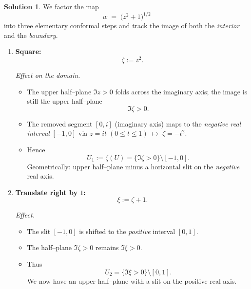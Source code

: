 \documentclass[12pt]{article}
\theoremstyle{definition} %
\newtheorem{solution}{Solution}
\theoremstyle{plain} %
\begin{document}
\begin{solution}
  We factor the map
  \[
     w \;=\; \bigl(z^{2}+1\bigr)^{1/2}
  \tag{$\ast$}\label{eq:full}
  \]
  into three elementary conformal steps and track the image of both the
  \emph{interior} and the \emph{boundary}.
  
  \medskip
  \begin{enumerate}[label=\textbf{Step~\arabic*.},wide,labelwidth=!,labelindent=0pt]
  
  \item \textbf{Square:}
        \[
           \zeta := z^{2}.
        \]
  
        \emph{Effect on the domain.}
        \begin{itemize}
          \item The upper half–plane $\Im z>0$ folds across the imaginary
                axis; the image is still the upper half–plane
                \[
                   \Im\zeta>0.
                \]
          \item The removed segment $[0,i]$ (imaginary axis) maps to the
                \emph{negative real interval} $[-1,0]$ via
                $z=it\;(0\le t\le1)\;\mapsto\;\zeta=-t^{2}$.
          \item Hence
                \[
                   U_1
                   :=\zeta(U)
                   = \bigl\{\Im\zeta>0\bigr\}\setminus[-1,0].
                \]
                Geometrically: upper half–plane minus a horizontal slit on
                the \emph{negative} real axis.
        \end{itemize}
  
  \item \textbf{Translate right by \(1\):}
        \[
           \xi := \zeta + 1.
        \]
  
        \emph{Effect.}
        \begin{itemize}
          \item The slit $[-1,0]$ is shifted to the \emph{positive}
                interval $[0,1]$.
          \item The half–plane $\Im\zeta>0$ remains $\Im\xi>0$.
          \item Thus
                \[
                   U_2
                   = \bigl\{\Im\xi>0\bigr\}\setminus[0,1].
                \]
                We now have an upper half–plane with a slit on the
                positive real axis.
        \end{itemize}
  

\end{enumerate}
\end{solution}
\end{document}
